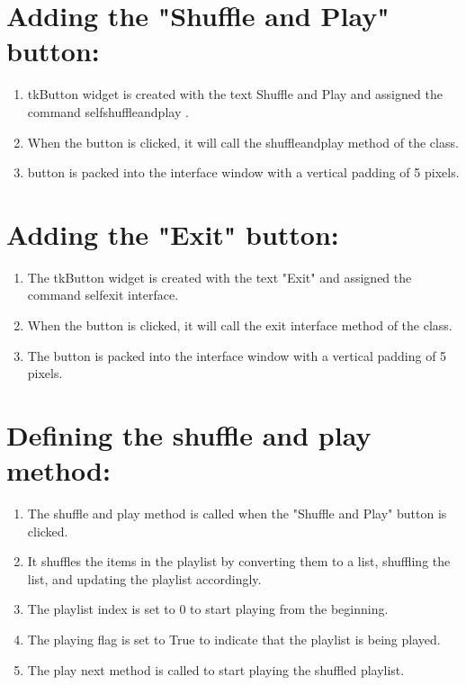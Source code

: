 \documentclass[12pt,onecolumn,notitlepage]{article}
\begin{document}
 
\section*{Adding the "Shuffle and Play" button:}
\begin{enumerate}
  \setlength\itemsep{0pt}
     \item tkButton widget is created with the text Shuffle and Play and assigned the command selfshuffleandplay .
    \item When the button is clicked, it will call the shuffleandplay method of the class.
    \item  button is packed into the interface window with a vertical padding of 5 pixels.


\end{enumerate} 
 
 
\section*{Adding the "Exit" button:}
\begin{enumerate}
  \setlength\itemsep{0pt}
  \item     The tkButton widget is created with the text "Exit" and assigned the command selfexit interface.
   \item When the button is clicked, it will call the exit interface method of the class.
    \item The button is packed into the interface window with a vertical padding of 5 pixels.
\end{enumerate} 
\section*{Defining the shuffle and play method:}
\begin{enumerate}
  \setlength\itemsep{0pt}
  \item     The shuffle and play method is called when the "Shuffle and Play" button is clicked.
   \item It shuffles the items in the playlist by converting them to a list, shuffling the list, and updating the playlist accordingly.
   \item The playlist index is set to 0 to start playing from the beginning.
   \item The playing flag is set to True to indicate that the playlist is being played.
    \item The play next method is called to start playing the shuffled playlist.
\end{enumerate} 
\end{document}
